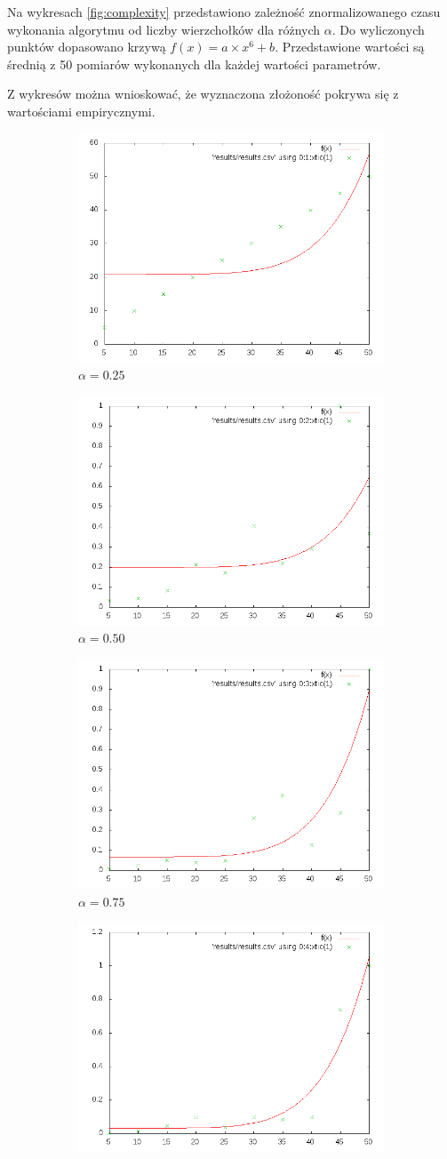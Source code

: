 \documentclass{llncs}
\begin{document}
Na wykresach \autoref{fig:complexity} przedstawiono zależność znormalizowanego czasu wykonania algorytmu od liczby wierzchołków dla różnych $\alpha$. Do wyliczonych punktów dopasowano krzywą $f(x) = a\times x^6 + b$. Przedstawione wartości są średnią z 50 pomiarów wykonanych dla każdej wartości parametrów.

Z wykresów można wnioskować, że wyznaczona złożoność pokrywa się z wartościami empirycznymi. 

\begin{figure}
\centering
\begin{subfigure}
  \centering
  \includegraphics[width=.4\linewidth]{img/25.png}
  \caption{$\alpha=0.25$}
  \label{fig:sub1}
\end{subfigure}%
\begin{subfigure}
  \centering
  \includegraphics[width=.4\linewidth]{img/50.png}
  \caption{$\alpha=0.50$}
  \label{fig:sub2}
\end{subfigure}
%
\begin{subfigure}
  \centering
  \includegraphics[width=.4\linewidth]{img/75.png}
  \caption{$\alpha=0.75$}
  \label{fig:sub2}
\end{subfigure}
%
\begin{subfigure}
  \centering
  \includegraphics[width=.4\linewidth]{img/100.png}

\end{subfigure}
\end{figure}
\end{document}
